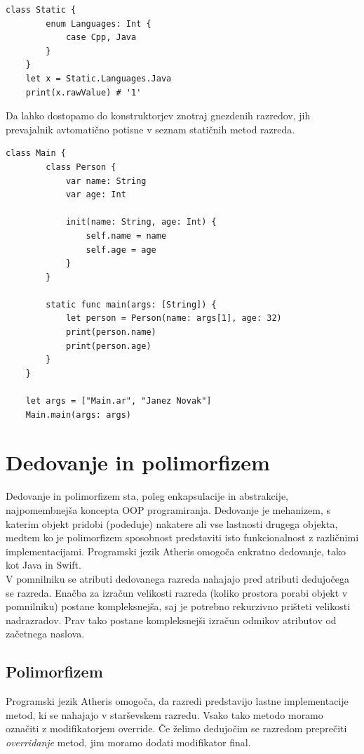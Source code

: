 \documentclass[a4paper, 12p]{book}
\begin{document}
\begin{lstlisting}[caption={}, captionpos=b]
	class Static {
	    enum Languages: Int {
	        case Cpp, Java
	    }
	}
	let x = Static.Languages.Java
	print(x.rawValue) # '1'
\end{lstlisting}

Da lahko dostopamo do konstruktorjev znotraj gnezdenih razredov, jih prevajalnik avtomatično potisne v seznam statičnih metod razreda.

\begin{lstlisting}[caption={Definicija gnezdenega razreda in njegova uporaba.}, captionpos=b, label={lst:nestedClassAth}]
	class Main {
		class Person {
			var name: String
			var age: Int
		
			init(name: String, age: Int) {
				self.name = name
				self.age = age
			}
		}
		
		static func main(args: [String]) {
			let person = Person(name: args[1], age: 32)
			print(person.name)
			print(person.age)
		}
	}
	
	let args = ["Main.ar", "Janez Novak"]
	Main.main(args: args)
\end{lstlisting}

\section{Dedovanje in polimorfizem}

Dedovanje in polimorfizem sta, poleg enkapsulacije in abstrakcije, najpomembnejša koncepta OOP programiranja. Dedovanje je mehanizem, s katerim objekt pridobi (podeduje) nakatere ali vse lastnosti drugega objekta, medtem ko je polimorfizem sposobnost predstaviti isto funkcionalnost z različnimi implementacijami. Programski jezik Atheris omogoča enkratno dedovanje, tako kot Java in Swift. \\
\indent V pomnilniku se atributi dedovanega razreda nahajajo pred atributi dedujočega se razreda. Enačba za izračun velikosti razreda (koliko prostora porabi objekt v pomnilniku) postane kompleksnejša, saj je potrebno rekurzivno prišteti velikosti nadrazradov. Prav tako postane kompleksnejši izračun odmikov atributov od začetnega naslova.

\subsection{Polimorfizem}

Programski jezik Atheris omogoča, da razredi predstavijo lastne implementacije metod, ki se nahajajo v starševskem razredu. Vsako tako metodo moramo označiti z modifikatorjem {\ttfamily override}. Če želimo dedujočim se razredom preprečiti \textit{overridanje} metod, jim moramo dodati modifikator {\ttfamily final}.
\end{document}
